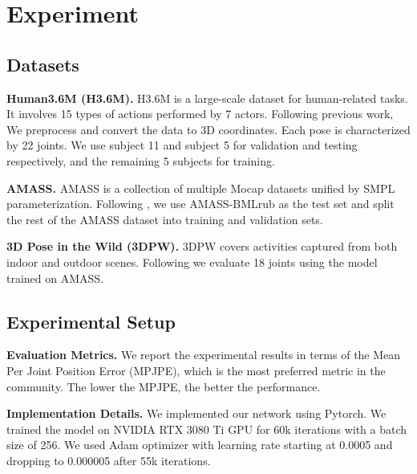 \documentclass[10pt,twocolumn,letterpaper]{article}
\begin{document}
\section{Experiment}

    



    

    

\subsection{Datasets}
\noindent
\textbf{Human3.6M (H3.6M). }
H3.6M \cite{ionescu2013human3} is a large-scale dataset for human-related tasks. It involves 15 types of actions performed by 7 actors. Following previous work, We preprocess and convert the data to 3D coordinates. Each pose is characterized by 22 joints. We use subject 11 and subject 5 for validation and testing respectively, and the remaining 5 subjects for training.

\noindent
\textbf{AMASS. }
AMASS \cite{mahmood2019amass} is a collection of multiple Mocap datasets unified by SMPL parameterization. Following \cite{guo2023back}, we use AMASS-BMLrub as the test set and split the rest of the AMASS dataset into training and validation sets.

\noindent
\textbf{3D Pose in the Wild (3DPW). }
3DPW \cite{von2018recovering} covers activities captured from both indoor and outdoor scenes. Following \cite{guo2023back} we evaluate 18 joints using the model trained on AMASS.



    
    






    


    
\subsection{Experimental Setup}
\noindent
\textbf{Evaluation Metrics. }
We report the experimental results in terms of the Mean Per Joint Position Error (MPJPE), which is the most preferred metric in the community.
The lower the MPJPE, the better the performance.

\noindent
\textbf{Implementation Details. }
We implemented our network using Pytorch. We trained the model on NVIDIA RTX 3080 Ti GPU for 60k iterations with a batch size of 256. We used Adam optimizer \cite{kingma2014adam} with learning rate starting at 0.0005 and dropping to 0.000005 after 55k iterations.
\end{document}
